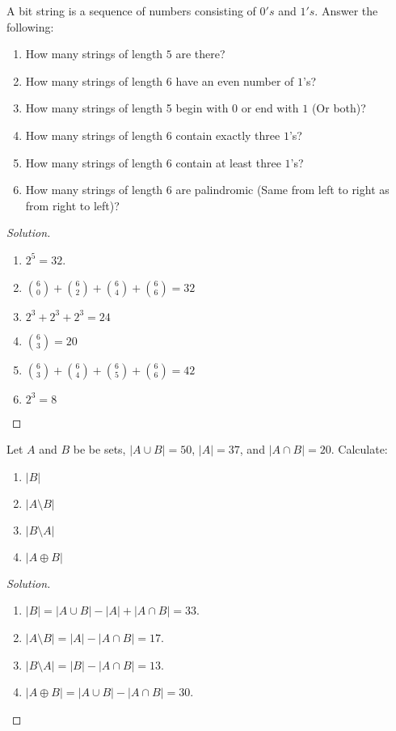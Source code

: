         \begin{problem}
            A bit string is a sequence of numbers consisting of $0's$ and $1's$.
            Answer the following:
        \begin{enumerate}
            \item How many strings of length $5$ are there?
            \item How many strings of length $6$ have an even number of $1$'s?
            \item How many strings of length 5 begin with $0$ or end with $1$ (Or both)?
            \item How many strings of length $6$ contain exactly three $1$'s?
            \item How many strings of length $6$ contain at least three $1$'s?
            \item How many strings of length $6$ are palindromic (Same from left to right as from right to left)?
        \end{enumerate}
        \end{problem}
        \begin{proof}[Solution]
        \vspace{-\topsep}
        \
        \begin{enumerate}
            \item $2^{5}=32$.
            \item $\binom{6}{0}+\binom{6}{2}+\binom{6}{4}+\binom{6}{6}=32$
            \item $2^{3}+2^{3}+2^{3}=24$
            \item $\binom{6}{3} = 20$
            \item $\binom{6}{3}+\binom{6}{4}+\binom{6}{5}+\binom{6}{6} = 42$
            \item $2^{3}=8$
        \end{enumerate}
        \end{proof}
        \begin{problem}
        Let $A$ and $B$ be be sets, $|A\cup B| = 50$, $|A| = 37$, and $|A\cap B| = 20$. Calculate:
        \begin{enumerate}
            \item $|B|$
            \item $|A\setminus B|$
            \item $|B\setminus A|$
            \item $|A\oplus B|$
        \end{enumerate}
        \end{problem}
        \begin{proof}[Solution]
        \par
        \begin{enumerate}
            \item $|B| = |A\cup B|-|A|+|A\cap B| = 33$.
            \item $|A\setminus B| = |A|-|A\cap B| = 17$.
            \item $|B\setminus A| = |B| - |A\cap B| = 13$.
            \item $|A\oplus B| = |A\cup B|- |A\cap B| = 30$.
        \end{enumerate}
        \end{proof}
